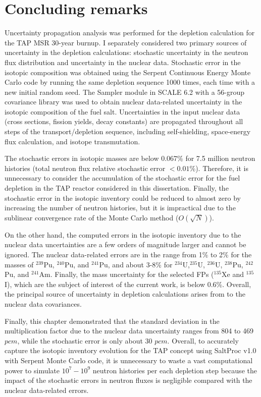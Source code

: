 \section{Concluding remarks}
Uncertainty propagation analysis was performed for the depletion calculation 
for the \gls{TAP} \gls{MSR} 30-year burnup. I separately considered two 
primary sources of uncertainty in the depletion calculations: stochastic 
uncertainty in the neutron flux distribution and uncertainty in the nuclear 
data. Stochastic error in the isotopic composition was obtained using the 
Serpent Continuous Energy Monte Carlo code by running the same depletion 
sequence 1000 times, each time with a new initial random seed. The 
Sampler module in SCALE 6.2 with a 56-group covariance library was used to 
obtain nuclear data-related uncertainty in the isotopic composition of the 
fuel salt. 
Uncertainties in the input nuclear data (cross sections, fission yields, decay 
constants) are propagated throughout all steps of the transport/depletion 
sequence, including self-shielding, space-energy flux calculation, and isotope 
transmutation. 

The stochastic errors in isotopic masses are below 0.067\% 
for 7.5 million neutron histories (total neutron flux relative stochastic 
error $<0.01$\%). Therefore, it is unnecessary to consider the accumulation of 
the stochastic error for the fuel depletion in the \gls{TAP} reactor 
considered in this dissertation.
Finally, the stochastic error in the isotopic inventory could be reduced to 
almost zero by increasing the number of neutron histories, but it is 
impractical due to the sublinear convergence rate of the Monte Carlo method 
($O(\sqrt{N})$).

On the other hand, the computed errors in the isotopic inventory due to the 
nuclear data uncertainties are a few orders of magnitude larger and cannot 
be ignored. The nuclear data-related errors are in the range from 1\% to 2\% 
for the masses of $^{239}$Pu, $^{240}$Pu, and $^{241}$Pu, and about 3-8\% for  
$^{234}$U,$^{235}$U, $^{236}$U, $^{238}$Pu, $^{242}$Pu, and $^{241}$Am. 
Finally, the mass uncertainty for the selected \glspl{FP} ($^{135}$Xe and 
$^{135}$I), which are the subject of interest of the current work, is below 
0.6\%. Overall, the principal source of uncertainty in depletion calculations 
arises from to the nuclear data covariances.

Finally, this chapter demonstrated that the standard deviation in the 
multiplication factor due to the nuclear data uncertainty ranges from 804 to 
469 $pcm$, while the stochastic error is only about 30 $pcm$. Overall, to 
accurately capture the isotopic inventory evolution for the \gls{TAP} concept 
using SaltProc v1.0 with Serpent Monte Carlo code, it is unnecessary to 
waste a vast computational power to simulate $10^7-10^9$ neutron histories per 
each depletion step because the impact of the stochastic errors in 
neutron fluxes is negligible compared with the nuclear data-related errors.
